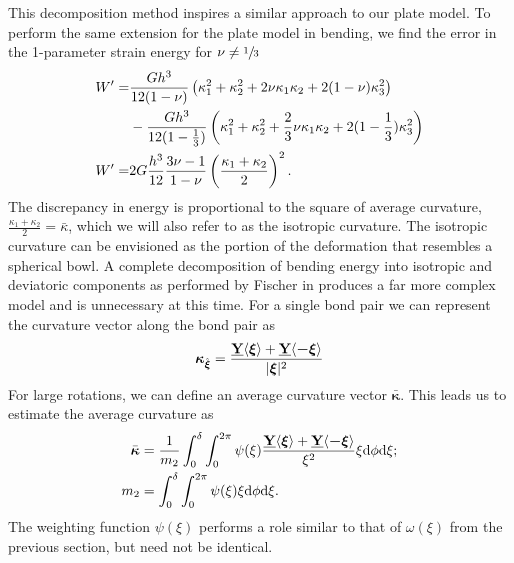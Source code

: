 \documentclass[preprint,review,12pt]{elsarticle}
\newcommand\vstate[3]{%
	\mathbf{\underline{#1}}%
	\ifstrempty{#2}{}{[#2]}%
	\ifstrempty{#3}{}{\langle #3 \rangle}}
\begin{document}
This decomposition method inspires a similar approach to our plate model. To perform the same extension for the plate model in bending, we find the error in the 1-parameter strain energy for \(\nu \neq \sfrac{1}{3}\)
%
\begin{align}
    W'=&\frac{G h^3}{12(1-\nu)} \left(\kappa_1^2+\kappa_2^2+2\nu\kappa_1\kappa_2+2(1-\nu)\kappa_3^2 \right)\notag\\
    &-\frac{G h^3}{12(1-\frac{1}{3})} \left(\kappa_1^2+\kappa_2^2+\frac{2}{3}\nu\kappa_1\kappa_2+2(1-\frac{1}{3})\kappa_3^2 \right) \notag \\
    W'=&2G \frac{h^3}{12}\frac{3\nu-1}{1-\nu} \left(\frac{\kappa_1+\kappa_2}{2}\right)^2.\notag
\end{align}
%
The discrepancy in energy is proportional to the square of average curvature, \(\frac{\kappa_1+\kappa_2}{2} = \bar{\kappa}\), which we will also refer to as the isotropic curvature.  The isotropic curvature can be envisioned as the portion of the deformation that resembles a spherical bowl.  A complete decomposition of bending energy into isotropic and deviatoric components as performed by Fischer in \cite{fischer1992bending} produces a far more complex model and is unnecessary at this time.  For a single bond pair we can represent the curvature vector along the bond pair as 
%
\begin{equation}
    \boldsymbol{\kappa} _{\hat{\boldsymbol{\xi}}} = \frac{\vstate{Y}{}{\boldsymbol{\xi}}+\vstate{Y}{}{\boldsymbol{-\xi}}}{|\boldsymbol{\xi}|^2}\notag
\end{equation}
%
%
For large rotations, we can define an average curvature vector \(\bar{\boldsymbol{\kappa}}\).
This leads us to estimate the average curvature as 
%
\begin{align}
    \bar{\boldsymbol{\kappa}} &= \frac{1}{m_2} \int_0^\delta \int_0^{2\pi}\psi(\xi)\frac{\vstate{Y}{}{\boldsymbol{\xi}}+\vstate{Y}{}{\boldsymbol{-\xi}}}{\xi^2} \xi {\rm d}\phi {\rm d}\xi ;\notag \\
    m_2 &= \int_0^\delta \int_0^{2\pi}\psi(\xi)\xi {\rm d}\phi {\rm d}\xi. \notag
\end{align}
%
The weighting function \(\psi(\xi)\) performs a role similar to that of \(\omega(\xi)\) from the previous section, but need not be identical.
\end{document}
